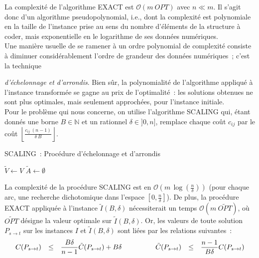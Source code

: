 \documentclass[10pt,francais]{llncs}
\begin{document}
La complexit\'e de l'algorithme EXACT est $\mathcal{O}(m\ OPT)$ avec $n \ll m$. Il s'agit donc d'un algorithme pseudopolynomial, i.e., dont la complexit\'e est polynomiale en la taille de l'instance prise au sens du nombre d'\'el\'ements de la structure \`a coder, mais exponentielle en le logarithme de ses donn\'ees num\'eriques.\\
Une mani\`ere usuelle de se ramener \`a un ordre polynomial de complexit\'e consiste \`a diminuer consid\'erablement l'ordre de grandeur des donn\'ees num\'eriques~; c'est la technique {\emph{ d'\'echelonnage et d'arrondis}. Bien s\^ur, la polynomialit\'e de l'algorithme appliqu\'e \`a l'instance transform\'ee se gagne au prix de l'optimalit\'e~: les solutions obtenues ne sont plus optimales, mais seulement approch\'ees, pour l'instance initiale.\\
Pour le probl\`eme qui nous concerne, on utilise l'algorithme SCALING qui, \'etant donn\'es une borne $B\in \mathbb{N}$ et un rationnel $\delta\in ]0,n]$,  remplace chaque co\^ut $c_{ij}$ par le co\^ut $\displaystyle \left\lfloor\frac{c_{ij}\ (n-1)}{\delta\ B} \right\rfloor$.  

\begin{algorithm}\label{algo-scaling}
\caption{SCALING~: Proc\'edure d'\'echelonnage et d'arrondis}
\Entree{$I=\left(G=(V,A),\ c:A\rightarrow\mathbb{N}\right)$ graphe arc-valu\'e, $B\in \mathbb{N}$, $\delta\in]0,n]$}
\BlankLine
{}
\BlankLine
$\tilde{V} \leftarrow V$\;
$\tilde{A} \leftarrow \emptyset$\;
\BlankLine
{}
\end{algorithm}

La complexit\'e de la proc\'edure SCALING est en $\displaystyle \mathcal{O}\left(m\, \log\left(\frac{n}{\delta}\right)\right)$ (pour chaque arc, une recherche dichotomique dans l'espace $\displaystyle [0,\frac{n}{\delta}]$). De plus, la proc\'edure EXACT appliqu\'ee \`a l'instance $\tilde{I}(B,\delta)$ n\'ecessiterait un temps $\mathcal{O}(m\ \widetilde{OPT})$, o\`u $\widetilde{OPT}$ d\'esigne la valeur optimale sur $\tilde{I}(B,\delta)$. Or, les valeurs de toute solution $P_{s\rightarrow t}$ sur les instances $I$ et $\tilde{I}(B,\delta)$ sont li\'ees par les relations suivantes~:
$$\begin{array}{lclclcl}
			C(P_{s\rightarrow t})	
	&\leq	&\displaystyle \frac{B\delta}{n-1}\tilde{C}(P_{s\rightarrow t})+B\delta	&\hspace*{1cm}&
			\tilde{C}(P_{s\rightarrow t})	
	&\leq	&\displaystyle \frac{n-1}{B\delta}C(P_{s\rightarrow t})
\end{array}$$

}
\end{document}
